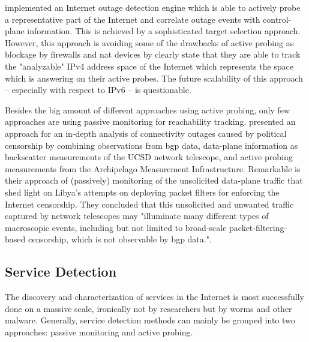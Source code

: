 \citet{Quan12a} implemented an Internet outage detection engine which is able to
actively probe a representative part of the Internet and correlate outage
events with \gls{control-plane} information. This is achieved by a 
sophisticated target selection approach. 
However, this approach is avoiding some of the drawbacks of active probing as 
blockage by firewalls and \gls{nat} devices by clearly state that they are able 
to track the "analyzable" \gls{IPv4} address space of the Internet which 
represents the space which is answering on their active probes. 
The future scalability of this approach -- especially with respect to \gls{IPv6} 
-- is questionable. 

Besides the big amount of different approaches using active probing, only few
approaches are using passive monitoring for reachability tracking.
\citet{Dainotti:2011:ACI} presented an approach for an in-depth analysis of
connectivity outages caused by political censorship by combining observations
from \gls{bgp} data, \gls{data-plane} information as backscatter measurements 
of the UCSD network telescope, and active probing measurements from the Archipelago Measurement Infrastructure. Remarkable is 
their approach of (passively) monitoring of the unsolicited \gls{data-plane} 
traffic that shed light on Libya's attempts on deploying packet filters for 
enforcing the Internet censorship. 
They concluded that this unsolicited and unwanted traffic 
captured by network telescopes may "illuminate many different types of 
macroscopic events, including but not limited to broad-scale 
packet-filtering-based censorship, which is not observable by \gls{bgp} 
data."\citep{Dainotti:2011:ACI}.

\subsection{Service Detection} 

The discovery and characterization of services in the Internet is most
successfully done on a massive scale, ironically not by researchers but by worms
and other malware\citep{Chen:2007}. Generally, service detection methods can 
mainly be grouped into two approaches: passive monitoring and active probing. 

